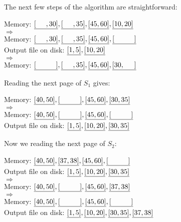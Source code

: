 \begin{sol}
\noindent The next few steps of the algorithm are straightforward:

\begin{center}
    Memory: $\uline{[\hspace{5mm}, 30]}, \uline{[\hspace{5mm}, 35]}, \uline{[45, 60]}, \uline{[10, 20]}$ \\
    $\Rightarrow$ \\
    Memory: $\uline{[\hspace{5mm}, 30]}, \uline{[\hspace{5mm}, 35]}, \uline{[45, 60]}, \uline{[\hspace{10mm}]}$ \\
    Output file on disk: $\uline{[1, 5]}, \uline{[10, 20]}$ \\
    $\Rightarrow$ \\
    Memory: $\uline{[\hspace{10mm}]}, \uline{[\hspace{5mm}, 35]}, \uline{[45, 60]}, \uline{[30, \hspace{5mm}]}$
\end{center}

\noindent Reading the next page of $S_1$ gives:

\begin{center}
    Memory: $\uline{[40, 50]}, \uline{[\hspace{10mm}]}, \uline{[45, 60]}, \uline{[30, 35]}$ \\
    $\Rightarrow$ \\
    Memory: $\uline{[40, 50]}, \uline{[\hspace{10mm}]}, \uline{[45, 60]}, \uline{[\hspace{10mm}]}$ \\
    Output file on disk: $\uline{[1, 5]}, \uline{[10, 20]}, \uline{[30, 35]}$ \\
\end{center}

\noindent Now we reading the next page of $S_2$:

\begin{center}
    Memory: $\uline{[40, 50]}, \uline{[37, 38]}, \uline{[45, 60]}, \uline{[\hspace{10mm}]}$ \\
    Output file on disk: $\uline{[1, 5]}, \uline{[10, 20]}, \uline{[30, 35]}$ \\
    $\Rightarrow$ \\
    Memory: $\uline{[40, 50]}, \uline{[\hspace{10mm}]}, \uline{[45, 60]}, \uline{[37, 38]}$ \\
    $\Rightarrow$ \\
    Memory: $\uline{[40, 50]}, \uline{[\hspace{10mm}]}, \uline{[45, 60]}, \uline{[\hspace{10mm}]}$ \\
    Output file on disk: $\uline{[1, 5]}, \uline{[10, 20]}, \uline{[30, 35]}, \uline{[37, 38]}$ \\
\end{center}


\end{sol}
